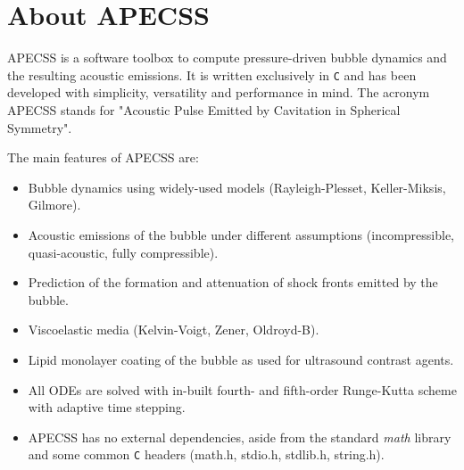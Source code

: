 \chapter{About APECSS}

APECSS is a software toolbox to compute pressure-driven bubble dynamics and the resulting acoustic emissions. It is written exclusively in {\tt C} and has been developed with simplicity, versatility and performance in mind. The acronym APECSS stands for "Acoustic Pulse Emitted by Cavitation in Spherical Symmetry".

The main features of APECSS are:\vspace{-1em}
\begin{itemize}[noitemsep]
\item Bubble dynamics using widely-used models (Rayleigh-Plesset, Keller-Miksis, Gilmore).
\item Acoustic emissions of the bubble under different assumptions (incompressible, quasi-acoustic, fully compressible).
\item Prediction of the formation and attenuation of shock fronts emitted by the bubble.
\item Viscoelastic media (Kelvin-Voigt, Zener, Oldroyd-B).
\item Lipid monolayer coating of the bubble as used for ultrasound contrast agents.
\item All ODEs are solved with in-built fourth- and fifth-order Runge-Kutta scheme with adaptive time stepping.
\item APECSS has no external dependencies, aside from the standard {\it math} library and some common {\tt C} headers (math.h, stdio.h, stdlib.h, string.h).
\end{itemize}

